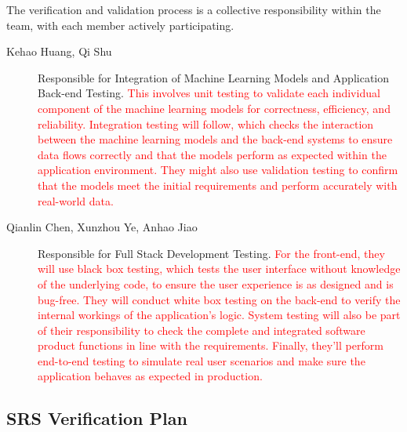 \documentclass[12pt, titlepage]{article}
\newcommand{\rt}[1]{\textcolor{red}{#1}}
\begin{document}
The verification and validation process is a collective responsibility within
the team, with each member actively participating.

\begin{description}
\item[Kehao Huang, Qi Shu] Responsible for Integration of Machine Learning Models
  and Application Back-end Testing. \rt{This involves unit testing to validate each 
  individual component of the machine learning models for correctness, efficiency, 
  and reliability. Integration testing will follow, which checks the interaction 
  between the machine learning models and the back-end systems to ensure data flows 
  correctly and that the models perform as expected within the application environment. 
  They might also use validation testing to confirm that the models meet the initial 
  requirements and perform accurately with real-world data.}
\item[Qianlin Chen, Xunzhou Ye, Anhao Jiao] Responsible for Full Stack Development
  Testing. \rt{For the front-end, they will use black box testing, which tests the 
  user interface without knowledge of the underlying code, to ensure the user experience 
  is as designed and is bug-free. They will conduct white box testing on the back-end to 
  verify the internal workings of the application's logic. System testing will also be 
  part of their responsibility to check the complete and integrated software product 
  functions in line with the requirements. Finally, they'll perform end-to-end testing 
  to simulate real user scenarios and make sure the application behaves as expected in 
  production.}
\end{description}

\subsection{SRS Verification Plan}
\end{document}
